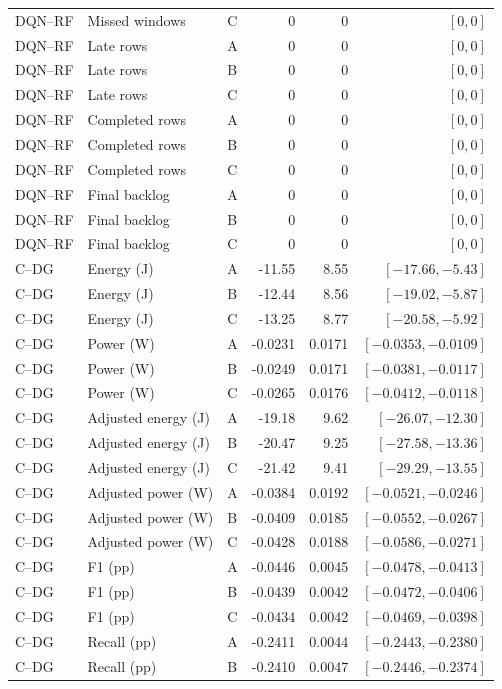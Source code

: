 \begin{longtable}{lllrrr}
DQN--RF & Missed windows & C & 0 & 0 & $[0,0]$\\
DQN--RF & Late rows & A & 0 & 0 & $[0,0]$\\
DQN--RF & Late rows & B & 0 & 0 & $[0,0]$\\
DQN--RF & Late rows & C & 0 & 0 & $[0,0]$\\
DQN--RF & Completed rows & A & 0 & 0 & $[0,0]$\\
DQN--RF & Completed rows & B & 0 & 0 & $[0,0]$\\
DQN--RF & Completed rows & C & 0 & 0 & $[0,0]$\\
DQN--RF & Final backlog & A & 0 & 0 & $[0,0]$\\
DQN--RF & Final backlog & B & 0 & 0 & $[0,0]$\\
DQN--RF & Final backlog & C & 0 & 0 & $[0,0]$\\
C--DG & Energy (J) & A & -11.55 & 8.55 & $[-17.66,-5.43]$\\
C--DG & Energy (J) & B & -12.44 & 8.56 & $[-19.02,-5.87]$\\
C--DG & Energy (J) & C & -13.25 & 8.77 & $[-20.58,-5.92]$\\
C--DG & Power (W) & A & -0.0231 & 0.0171 & $[-0.0353,-0.0109]$\\
C--DG & Power (W) & B & -0.0249 & 0.0171 & $[-0.0381,-0.0117]$\\
C--DG & Power (W) & C & -0.0265 & 0.0176 & $[-0.0412,-0.0118]$\\
C--DG & Adjusted energy (J) & A & -19.18 & 9.62 & $[-26.07,-12.30]$\\
C--DG & Adjusted energy (J) & B & -20.47 & 9.25 & $[-27.58,-13.36]$\\
C--DG & Adjusted energy (J) & C & -21.42 & 9.41 & $[-29.29,-13.55]$\\
C--DG & Adjusted power (W) & A & -0.0384 & 0.0192 & $[-0.0521,-0.0246]$\\
C--DG & Adjusted power (W) & B & -0.0409 & 0.0185 & $[-0.0552,-0.0267]$\\
C--DG & Adjusted power (W) & C & -0.0428 & 0.0188 & $[-0.0586,-0.0271]$\\
C--DG & F1 (pp) & A & -0.0446 & 0.0045 & $[-0.0478,-0.0413]$\\
C--DG & F1 (pp) & B & -0.0439 & 0.0042 & $[-0.0472,-0.0406]$\\
C--DG & F1 (pp) & C & -0.0434 & 0.0042 & $[-0.0469,-0.0398]$\\
C--DG & Recall (pp) & A & -0.2411 & 0.0044 & $[-0.2443,-0.2380]$\\
C--DG & Recall (pp) & B & -0.2410 & 0.0047 & $[-0.2446,-0.2374]$\\

\end{longtable}
